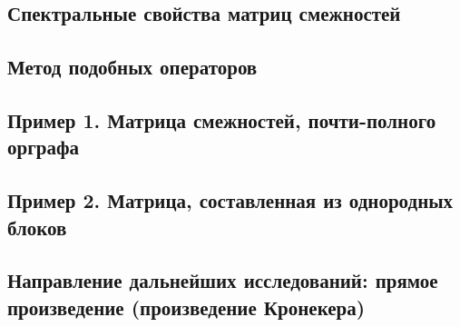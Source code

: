\subsection*{Спектральные свойства матриц смежностей}

\subsection*{Метод подобных операторов}

\subsection*{Пример 1. Матрица смежностей, почти-полного орграфа}

\subsection*{Пример 2. Матрица, составленная из однородных блоков}

\subsection*{Направление дальнейших исследований: прямое произведение (произведение Кронекера)}

